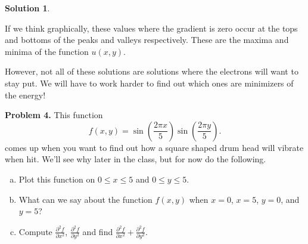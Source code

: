 \documentclass[12pt]{report} %
\theoremstyle{definition}
\newtheorem{solution}{Solution}
\begin{document}
\begin{solution}
\begin{enumerate}[(a)]
    If we think graphically, these values where the gradient is zero occur at the tops and bottoms of the peaks and valleys respectively.  These are the maxima and minima of the function $u(x,y)$.
    
    However, not all of these solutions are solutions where the electrons will want to stay put.  We will have to work harder to find out which ones are minimizers of the energy!
\end{enumerate}
\end{solution}


\noindent\textbf{Problem 4.} This function
\[
f(x,y)=\sin\left(\frac{2\pi x}{5}\right)\sin\left(\frac{2\pi y}{5}\right).
\]
comes up when you want to find out how a square shaped drum head will vibrate when hit. We'll see why later in the class, but for now do the following.
\begin{enumerate}[(a)]
    \item Plot this function on $0\leq x \leq 5$ and $0\leq y \leq 5$.  
    \item What can we say about the function $f(x,y)$ when $x=0$, $x=5$, $y=0$, and $y=5$?
    \item Compute $\frac{\partial^2 f}{\partial x^2}$, $\frac{\partial^2 f}{\partial y^2}$ and find $\frac{\partial^2 f}{\partial x^2}+\frac{\partial^2 f}{\partial y^2}$.
\end{enumerate}
\end{document}
